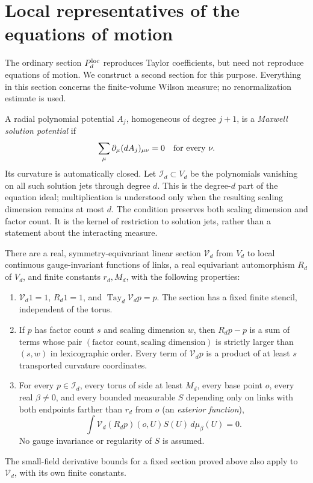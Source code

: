 \section{Local representatives of the equations of motion}
\label{ch02:equation-section}

The ordinary section $P_d^{\rm loc}$ reproduces Taylor coefficients,
but need not reproduce equations of motion. We construct a second
section for this purpose. Everything in this section concerns the
finite-volume Wilson measure; no renormalization estimate is used.

A radial polynomial potential $A_j$, homogeneous of degree $j+1$,
is a \emph{Maxwell solution potential} if
\[
 \sum_\mu\partial_\mu(dA_j)_{\mu\nu}=0\quad\hbox{for every }\nu.
\]
Its curvature is automatically closed. Let $\mathcal I_d\subset V_d$
be the polynomials vanishing on all such solution jets through degree
$d$. This is the degree-$d$ part of the equation ideal; multiplication
is understood only when the resulting scaling dimension remains at most $d$.
The condition preserves both scaling dimension and factor count.
It is the kernel of restriction to solution jets, rather than a
statement about the interacting measure.

\begin{theorem}
\label{ch02:equation-adapted}
There are a real, symmetry-equivariant linear section
$\mathcal V_d$ from $V_d$ to local continuous gauge-invariant functions of links, a real equivariant automorphism
$R_d$ of $V_d$, and finite constants $r_d,M_d$, with the following
properties:
\begin{enumerate}
\item $\mathcal V_d1=1$, $R_d1=1$, and
$\operatorname{Tay}_d\mathcal V_d p=p$.
The section has a fixed finite stencil, independent of the torus.
\item If $p$ has factor count $s$ and scaling dimension $w$,
then $R_dp-p$ is a sum of terms whose pair
$(\text{factor count},\text{scaling dimension})$ is strictly larger than $(s,w)$
in lexicographic order. Every term of $\mathcal V_dp$ is a product
of at least $s$ transported curvature coordinates.
\item For every $p\in\mathcal I_d$, every torus of side at least $M_d$,
every base point $o$, every real $\beta\ne0$, and every bounded measurable
$S$ depending only on links with both endpoints farther than $r_d$
from $o$ (an \emph{exterior function}),
\begin{equation}
 \int \mathcal V_d(R_dp)(o,U)S(U)\,d\mu_\beta(U)=0.
 \label{ch02:microscopic-null}
\end{equation}
No gauge invariance or regularity of $S$ is assumed.
\end{enumerate}
The small-field derivative bounds for a fixed section proved above
also apply to $\mathcal V_d$, with its own finite constants.
\end{theorem}

